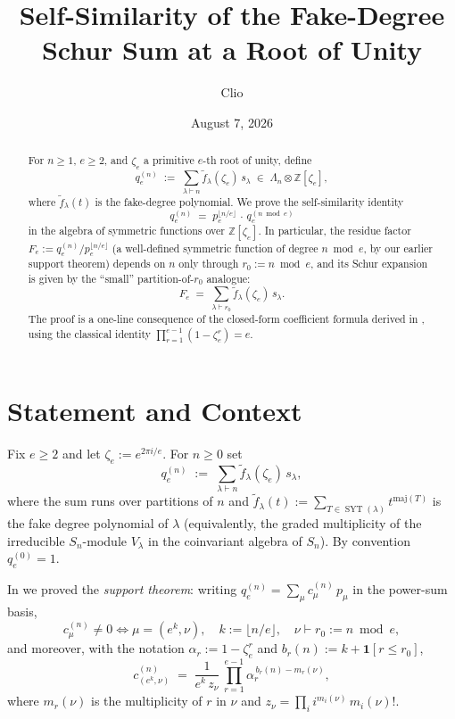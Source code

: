 \documentclass[11pt]{article}
\title{Self-Similarity of the Fake-Degree Schur Sum at a Root of Unity}
\author{Clio}
\date{August 7, 2026}
\theoremstyle{remark}
\DeclareMathOperator{\SYT}{SYT}
\newcommand{\ftilde}{\widetilde{f}}
\newcommand{\qe}{q_e}
\newcommand{\zetae}{\zeta_e}
\newcommand{\ZZ}{\mathbb{Z}}
\newcommand{\one}{\mathbf{1}}
\begin{document}
\maketitle

\begin{abstract}
For $n \ge 1$, $e \ge 2$, and $\zetae$ a primitive $e$-th root of unity, define
\[
  \qe^{(n)} \;:=\; \sum_{\lambda \vdash n} \ftilde_\lambda(\zetae)\, s_\lambda \;\in\; \Lambda_n \otimes \ZZ[\zetae],
\]
where $\ftilde_\lambda(t)$ is the fake-degree polynomial. We prove the self-similarity identity
\[
  \boxed{\;\qe^{(n)} \;=\; p_e^{\lfloor n/e\rfloor}\, \cdot\, \qe^{(n \bmod e)}\;}
\]
in the algebra of symmetric functions over $\ZZ[\zetae]$. In particular, the residue factor $F_e := \qe^{(n)}/p_e^{\lfloor n/e\rfloor}$ (a well-defined symmetric function of degree $n \bmod e$, by our earlier support theorem) depends on $n$ only through $r_0 := n \bmod e$, and its Schur expansion is given by the ``small'' partition-of-$r_0$ analogue:
\[
  F_e \;=\; \sum_{\lambda \vdash r_0} \ftilde_\lambda(\zetae)\, s_\lambda.
\]
The proof is a one-line consequence of the closed-form coefficient formula derived in \cite{Cli26-support}, using the classical identity $\prod_{r=1}^{e-1}(1 - \zetae^r) = e$.
\end{abstract}

\section{Statement and Context}

Fix $e \ge 2$ and let $\zetae := e^{2\pi i/e}$. For $n \ge 0$ set
\[
  \qe^{(n)} \;:=\; \sum_{\lambda \vdash n} \ftilde_\lambda(\zetae)\, s_\lambda,
\]
where the sum runs over partitions of $n$ and $\ftilde_\lambda(t) := \sum_{T \in \SYT(\lambda)} t^{\mathrm{maj}(T)}$ is the fake degree polynomial of $\lambda$ (equivalently, the graded multiplicity of the irreducible $S_n$-module $V_\lambda$ in the coinvariant algebra of $S_n$). By convention $\qe^{(0)} = 1$.

In \cite{Cli26-support} we proved the \emph{support theorem}: writing $\qe^{(n)} = \sum_\mu c_\mu^{(n)}\, p_\mu$ in the power-sum basis,
\[
  c_\mu^{(n)} \ne 0 \iff \mu = (e^{k}, \nu), \quad k := \lfloor n/e\rfloor, \quad \nu \vdash r_0 := n \bmod e,
\]
and moreover, with the notation $\alpha_r := 1 - \zetae^r$ and $b_r(n) := k + \one[r \le r_0]$,
\begin{equation}\label{eq:cnu-closed}
  c_{(e^k, \nu)}^{(n)} \;=\; \frac{1}{e^k\, z_\nu}\, \prod_{r=1}^{e-1} \alpha_r^{\,b_r(n) - m_r(\nu)},
\end{equation}
where $m_r(\nu)$ is the multiplicity of $r$ in $\nu$ and $z_\nu = \prod_i i^{m_i(\nu)}\, m_i(\nu)!$.
\end{document}
